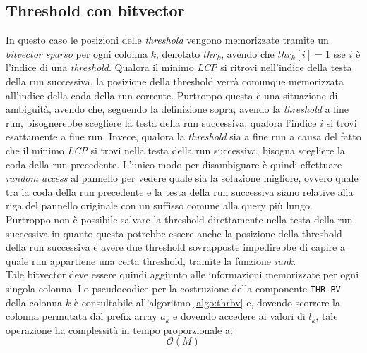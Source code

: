 \subsection{Threshold con bitvector}
In questo caso le posizioni delle \textit{threshold} vengono
memorizzate tramite un \textit{bitvector sparso} per ogni colonna $k$, denotato
$thr_k$, avendo che $thr_k[i]=1$ sse $i$ è l'indice di una \textit{threshold}.
Qualora il minimo \textit{LCP} si ritrovi nell'indice della testa della run
successiva, la posizione della threshold verrà comunque memorizzata all'indice
della coda della run corrente. Purtroppo questa è una situazione di ambiguità,
avendo che, seguendo la definizione sopra, avendo la \textit{threshold} a fine
run, bisognerebbe scegliere la testa della run successiva, qualora l'indice $i$
si trovi esattamente a fine run. Invece, qualora la
\textit{threshold} sia a fine run a causa del fatto che il minimo \textit{LCP}
si trovi nella testa della run successiva, bisogna scegliere la coda della run
precedente. L'unico modo per disambiguare è quindi effettuare \textit{random
  access} al pannello per vedere quale sia la
soluzione migliore, ovvero quale tra la coda della run precedente e la testa
della run successiva siano relative alla riga del pannello originale con un
suffisso comune alla query più lungo.\\
Purtroppo non è possibile salvare la threshold direttamente nella testa della
run successiva in quanto questa potrebbe essere anche la posizione della
threshold della run successiva e avere due threshold sovrapposte impedirebbe di
capire a quale run appartiene una certa threshold, tramite la funzione
\textit{rank}. \\
Tale bitvector deve essere quindi aggiunto alle informazioni memorizzate per
ogni singola colonna. Lo pseudocodice per la costruzione della componente
\texttt{THR-BV} della colonna $k$ è consultabile all'algoritmo \ref{algo:thrbv}
e, dovendo scorrere la colonna permutata dal prefix array $a_k$ e dovendo
accedere ai valori di $l_k$, tale operazione ha complessità in tempo
proporzionale a:
\begin{equation}
  \label{eq:thrbv}
  \mathcal{O}(M)
\end{equation}

